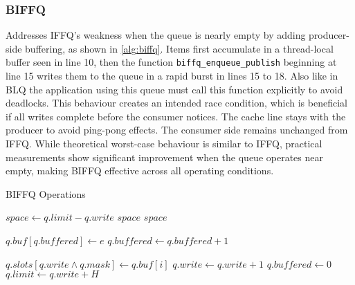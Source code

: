 \subsubsection{\acf{BIFFQ}}
Addresses \ac{IFFQ}'s weakness when the queue is nearly empty by adding producer-side buffering, as shown in \cref{alg:biffq}. Items first accumulate in a thread-local buffer seen in line 10, then the function \texttt{biffq\_enqueue\_publish} beginning at line 15 writes them to the queue in a rapid burst in lines 15 to 18. Also like in \ac{BLQ} the application using this queue must call this function explicitly to avoid deadlocks. This behaviour creates an intended race condition, which is beneficial if all writes complete before the consumer notices. The cache line stays with the producer to avoid ping-pong effects. The consumer side remains unchanged from \ac{IFFQ}. While theoretical worst-case behaviour is similar to \ac{IFFQ}, practical measurements show significant improvement when the queue operates near empty, making \ac{BIFFQ} effective across all operating conditions. \cite{MaffioneCacheAware}

\begin{algorithm}[!ht]
    \centering
    \captionsetup{justification=centering}
    \caption{\ac{BIFFQ} Operations \cite{MaffioneCacheAware}}
    \label{alg:biffq}
    \scriptsize
    \begin{algorithmic}[1]
            \State $space \gets q.limit - q.write$
                \State \Return $space$ 
            \EndIf
            \State \Return $space$
        \EndFunction
        
        \State
        
            \State $q.buf[q.buffered] \gets e$ 
            \State $q.buffered \gets q.buffered + 1$
        \EndFunction
        
        \State
        
                \State $q.slots[q.write \land q.mask] \gets q.buf[i]$ 
                \State $q.write \gets q.write + 1$
            \EndFor
            \State $q.buffered \gets 0$
            \State $q.limit \gets q.write + H$ 
        \EndFunction
    \end{algorithmic}
\end{algorithm}

